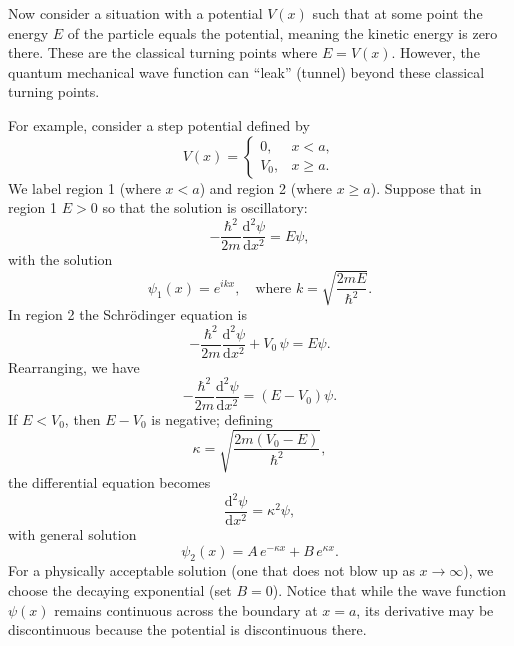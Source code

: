 \begin{remark}
Now consider a situation with a potential \(V(x)\) such that at some point the energy \(E\) of the particle equals the potential, meaning the kinetic energy is zero there. These are the classical turning points where \(E=V(x)\). However, the quantum mechanical wave function can “leak” (tunnel) beyond these classical turning points.

For example, consider a step potential defined by
\[
    V(x) = \begin{cases}
    0, & x < a,\\[1mm]
    V_0, & x \ge a.
    \end{cases}
\]
We label region 1 (where \(x < a\)) and region 2 (where \(x \ge a\)). Suppose that in region 1 \(E>0\) so that the solution is oscillatory:
\[
    -\frac{\hbar^2}{2m}\frac{\mathrm{d}^2 \psi}{\mathrm{d}x^2} = E \psi,
\]
with the solution
\[
    \psi_1(x) = e^{ikx},\quad\text{where } k = \sqrt{\frac{2mE}{\hbar^2}}.
\]
In region 2 the Schrödinger equation is
\[
    -\frac{\hbar^2}{2m}\frac{\mathrm{d}^2 \psi}{\mathrm{d}x^2} + V_0\,\psi = E \psi.
\]
Rearranging, we have
\[
    -\frac{\hbar^2}{2m}\frac{\mathrm{d}^2 \psi}{\mathrm{d}x^2} = (E-V_0) \psi.
\]
If \(E < V_0\), then \(E-V_0\) is negative; defining
\[
    \kappa = \sqrt{\frac{2m(V_0-E)}{\hbar^2}},
\]
the differential equation becomes
\[
    \frac{\mathrm{d}^2 \psi}{\mathrm{d}x^2} = \kappa^2 \psi,
\]
with general solution
\[
    \psi_2(x) = A\,e^{-\kappa x} + B\,e^{\kappa x}.
\]
For a physically acceptable solution (one that does not blow up as \(x\to\infty\)), we choose the decaying exponential (set \(B=0\)). Notice that while the wave function \(\psi(x)\) remains continuous across the boundary at \(x=a\), its derivative may be discontinuous because the potential is discontinuous there.
\end{remark}
